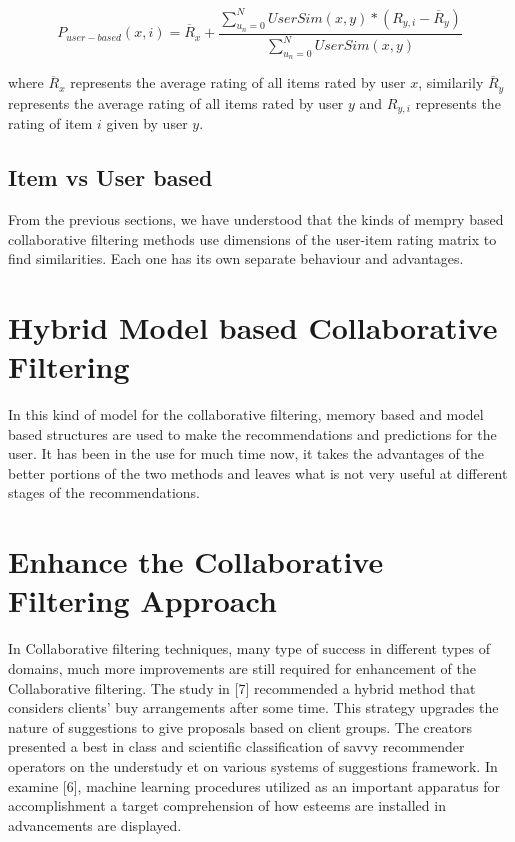 \documentclass[10pt,conference]{IEEEtran}
\begin{document}
\begin{equation}
P_{user-based}(x,i) = \overline{R}_{x} + \frac{\sum_{u_n = 0}^{N} UserSim(x,y) \ast (R_{y,i}-\overline{R}_{y})}{\sum_{u_n = 0}^{N} UserSim(x,y)}
\label{eq:UserPred} \tag{7}
\end{equation}


where $\overline{R}_{x}$ represents the average rating of all items rated by user $x$, similarily $\overline{R}_{y}$ represents the average rating of all items rated by user $y$ and $R_{y,i}$ represents the rating of item $i$ given by user $y$.


\subsection{Item vs User based}
From the previous sections, we have understood that the kinds of mempry based collaborative filtering methods use dimensions of the user-item rating matrix to find similarities.
Each one has its own separate behaviour and advantages.


\section{Hybrid Model based Collaborative Filtering}
In this kind of model for the collaborative filtering, memory based and model based structures are used to make the recommendations and predictions for the user. It has been in the use for much time now, it takes the advantages of the better portions of the two methods and leaves what is not very useful at different stages of the recommendations.

\section{Enhance the Collaborative Filtering Approach}
In Collaborative filtering techniques, many type of success in different types of domains, much more improvements are still required for enhancement of the Collaborative filtering.
The study in [7] recommended a hybrid method that considers clients' buy arrangements after some time. This strategy upgrades the nature of suggestions to give proposals based on client groups. The creators presented a best in class and scientific classification of savvy recommender operators on the understudy et on various systems of suggestions framework. In examine [6], machine learning procedures utilized as an important apparatus for accomplishment a target comprehension of how esteems are installed in advancements are displayed. 
\end{document}
